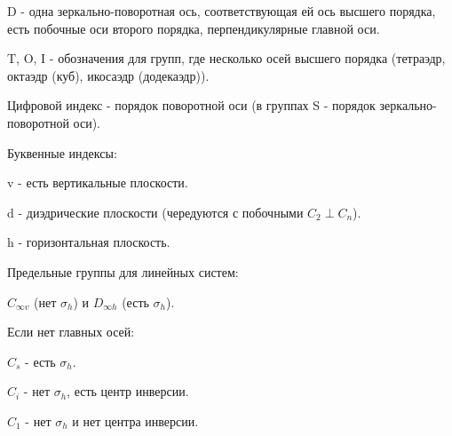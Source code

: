 \par\smallskip

D - одна зеркально-поворотная ось, соответствующая ей ось
высшего порядка, есть побочные оси второго порядка,
перпендикулярные главной оси.

\par\smallskip


T, O, I - обозначения для групп, где несколько осей высшего
порядка (тетраэдр, октаэдр (куб), икосаэдр (додекаэдр)). 

\par\smallskip	
	
Цифровой индекс - порядок поворотной оси (в группах S -
порядок зеркально-поворотной оси).

\par\smallskip

Буквенные индексы:	

\par\smallskip

v - есть вертикальные плоскости.

\par\smallskip

d - диэдрические плоскости (чередуются с побочными $C_2 \perp C_n$).

\par\smallskip

h - горизонтальная плоскость.

\par\smallskip
	
Предельные группы для линейных систем:

\par\smallskip

$C_{\infty v}$ (нет $\sigma _h$) и  $D_{\infty h}$ (есть $\sigma_h$).

\par\smallskip

Если нет главных осей:

\par\smallskip

$C_s$ - есть $\sigma _h$. 

\par\smallskip

$C_i$ - нет $\sigma _h$, есть центр инверсии.

\par\smallskip

$C_1$ - нет $\sigma _h$ и нет центра инверсии.

\par\bigskip
\par\bigskip
